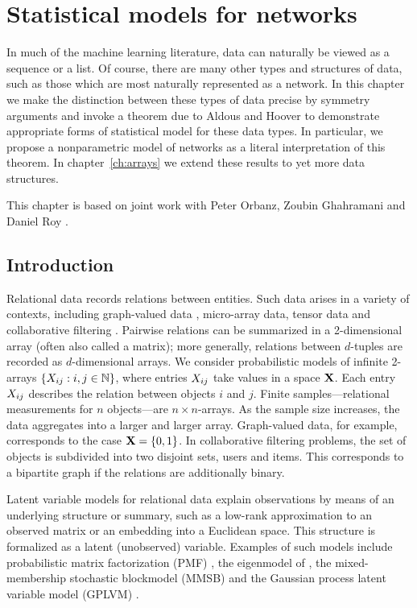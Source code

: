 
\inbpdocument

\chapter{Statistical models for networks}
\label{ch:networks}

In much of the machine learning literature, data can naturally be viewed as a sequence or a list.
Of course, there are many other types and structures of data, such as those which are most naturally represented as a network.
In this chapter we make the distinction between these types of data precise by symmetry arguments and invoke a theorem due to Aldous and Hoover to demonstrate appropriate forms of statistical model for these data types.
In particular, we propose a nonparametric model of networks as a literal interpretation of this theorem.
In chapter~\ref{ch:arrays} we extend these results to yet more data structures.

This chapter is based on joint work with Peter Orbanz, Zoubin Ghahramani and Daniel Roy \citep{Lloyd2012-sb}.

\section{Introduction}

Relational data records relations between entities.
Such data arises in a variety of contexts, including graph-valued data \citep[e.g.][]{Airoldi2008-fr,Hoff2002-vy}, micro-array data, tensor data \citep[e.g.][]{Xu2012-ub} and collaborative filtering \citep[e.g.][]{Salakhutdinov2008-tp}.
Pairwise relations can be summarized in a 2-dimensional array (often also called a matrix);
more generally, relations between $d$-tuples are recorded as $d$-dimensional arrays.
We consider probabilistic models of infinite 2-arrays $\{X_{ij} : i,j\in\mathbb{N}\}$, where entries $X_{ij}$ take values in a space $\mathbf{X}$. 
Each entry $X_{ij}$ describes the relation between objects $i$ and $j$. Finite
samples---relational measurements for $n$ objects---are $n\times n$-arrays. As the sample size increases, the data aggregates into
a larger and larger array. 
Graph-valued data, for example, corresponds to the case $\mathbf{X}=\lbrace{0,1}\rbrace$.
In collaborative filtering problems, the set of objects is subdivided into two disjoint sets, \eg users and items.
This corresponds to a bipartite graph if the relations are additionally binary.

Latent variable models for relational data explain observations by means of an underlying structure
or summary,
such as a low-rank approximation to an observed matrix or an embedding into a Euclidean space.
This structure is formalized as a latent (unobserved) variable.
Examples of such models include probabilistic matrix factorization (PMF) \citep{Salakhutdinov2008}, the eigenmodel of 
\citet{Hoff2007a}, the mixed-membership stochastic blockmodel (MMSB) \citep{Airoldi2008}
and the Gaussian process latent variable model (GPLVM) \citep[e.g.][]{Lawrence2009}.

